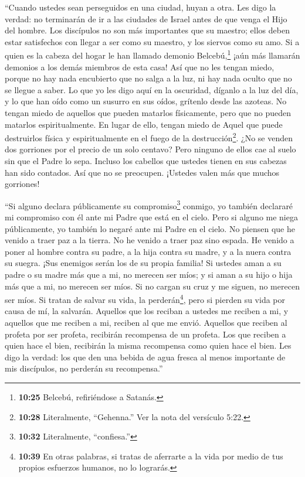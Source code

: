  ``Cuando ustedes sean perseguidos en una ciudad, huyan a
otra. Les digo la verdad: no terminarán de ir a las ciudades de Israel
antes de que venga el Hijo del hombre.  Los discípulos no
son más importantes que su maestro;  ellos deben estar
satisfechos con llegar a ser como su maestro, y los siervos como su amo.
Si a quien es la cabeza del hogar le han llamado demonio
Belcebú,\footnote{\textbf{10:25} Belcebú, refiriéndose a Satanás.} ¡aún
más llamarán demonios a los demás miembros de esta casa! 
Así que no les tengan miedo, porque no hay nada encubierto que no salga
a la luz, ni hay nada oculto que no se llegue a saber.  Lo
que yo les digo aquí en la oscuridad, díganlo a la luz del día, y lo que
han oído como un susurro en sus oídos, grítenlo desde las azoteas.
 No tengan miedo de aquellos que pueden matarlos
físicamente, pero que no pueden matarlos espiritualmente. En lugar de
ello, tengan miedo de Aquel que puede destruirlos física y
espiritualmente en el fuego de la destrucción\footnote{\textbf{10:28}
  Literalmente, ``Gehenna.'' Ver la nota del versículo 5:22.}.
 ¿No se venden dos gorriones por el precio de un solo
centavo? Pero ninguno de ellos cae al suelo sin que el Padre lo sepa.
 Incluso los cabellos que ustedes tienen en sus cabezas han
sido contados.  Así que no se preocupen. ¡Ustedes valen más
que muchos gorriones!

 ``Si alguno declara públicamente su compromiso\footnote{\textbf{10:32}
  Literalmente, ``confiesa.''} conmigo, yo también declararé mi
compromiso con él ante mi Padre que está en el cielo.  Pero
si alguno me niega públicamente, yo también lo negaré ante mi Padre en
el cielo.  No piensen que he venido a traer paz a la
tierra. No he venido a traer paz sino espada.  He venido a
poner al hombre contra su padre, a la hija contra su madre, y a la nuera
contra su suegra.  ¡Sus enemigos serán los de su propia
familia!  Si ustedes aman a su padre o su madre más que a
mi, no merecen ser míos; y si aman a su hijo o hija más que a mi, no
merecen ser míos.  Si no cargan su cruz y me siguen, no
merecen ser míos.  Si tratan de salvar su vida, la
perderán\footnote{\textbf{10:39} En otras palabras, si tratas de
  aferrarte a la vida por medio de tus propios esfuerzos humanos, no lo
  lograrás.}, pero si pierden su vida por causa de mí, la salvarán.
 Aquellos que los reciban a ustedes me reciben a mi, y
aquellos que me reciben a mi, reciben al que me envió. 
Aquellos que reciben al profeta por ser profeta, recibirán recompensa de
un profeta. Los que reciben a quien hace el bien, recibirán la misma
recompensa como quien hace el bien.  Les digo la verdad:
los que den una bebida de agua fresca al menos importante de mis
discípulos, no perderán su recompensa.''


